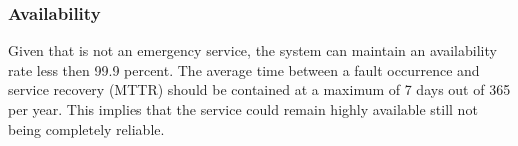 \subsubsection{Availability}
Given that \app is not an emergency service, the system can maintain an availability rate less then 99.9 percent. The average time between a fault occurrence and service recovery (MTTR) should be contained at a maximum of 7 days out of 365 per year. This implies that the service could remain highly available still not being completely reliable.

